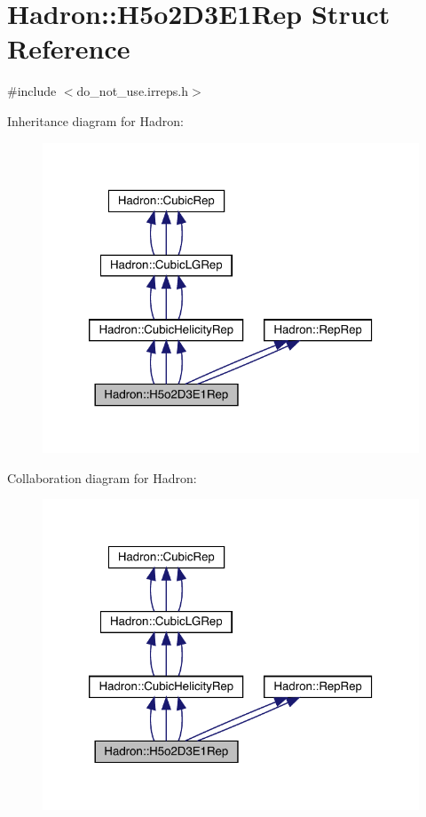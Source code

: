 \hypertarget{structHadron_1_1H5o2D3E1Rep}{}\section{Hadron\+:\+:H5o2\+D3\+E1\+Rep Struct Reference}
\label{structHadron_1_1H5o2D3E1Rep}


{\ttfamily \#include $<$do\+\_\+not\+\_\+use.\+irreps.\+h$>$}



Inheritance diagram for Hadron\+:
\nopagebreak
\begin{figure}[H]
\begin{center}
\leavevmode
\includegraphics[width=320pt]{d9/d82/structHadron_1_1H5o2D3E1Rep__inherit__graph}
\end{center}
\end{figure}


Collaboration diagram for Hadron\+:
\nopagebreak
\begin{figure}[H]
\begin{center}
\leavevmode
\includegraphics[width=320pt]{dc/d6d/structHadron_1_1H5o2D3E1Rep__coll__graph}
\end{center}
\end{figure}
